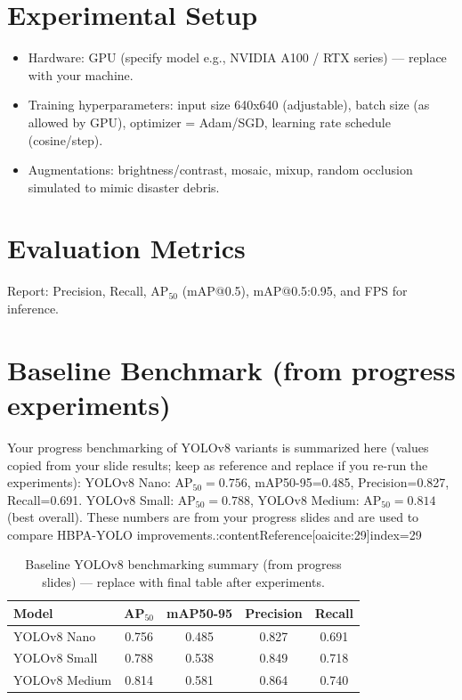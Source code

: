 \documentclass[12pt,a4paper]{report}
\begin{document}
\section{Experimental Setup}
\begin{itemize}
  \item Hardware: GPU (specify model e.g., NVIDIA A100 / RTX series) — replace with your machine.
  \item Training hyperparameters: input size 640x640 (adjustable), batch size (as allowed by GPU), optimizer = Adam/SGD, learning rate schedule (cosine/step).
  \item Augmentations: brightness/contrast, mosaic, mixup, random occlusion simulated to mimic disaster debris.
\end{itemize}

\section{Evaluation Metrics}
Report: Precision, Recall, AP$_{50}$ (mAP@0.5), mAP@0.5:0.95, and FPS for inference.

\section{Baseline Benchmark (from progress experiments)}
Your progress benchmarking of YOLOv8 variants is summarized here (values copied from your slide results; keep as reference and replace if you re-run the experiments): YOLOv8 Nano: AP$_{50}=0.756$, mAP50-95=0.485, Precision=0.827, Recall=0.691. YOLOv8 Small: AP$_{50}=0.788$, YOLOv8 Medium: AP$_{50}=0.814$ (best overall). These numbers are from your progress slides and are used to compare HBPA-YOLO improvements.:contentReference[oaicite:29]{index=29}

\begin{table}[H]
\centering
\caption{Baseline YOLOv8 benchmarking summary (from progress slides) — replace with final table after experiments.}
\begin{tabular}{lcccc}
\hline
Model & AP$_{50}$ & mAP50-95 & Precision & Recall \\
\hline
YOLOv8 Nano & 0.756 & 0.485 & 0.827 & 0.691 \\
YOLOv8 Small & 0.788 & 0.538 & 0.849 & 0.718 \\
YOLOv8 Medium & 0.814 & 0.581 & 0.864 & 0.740 \\
\hline
\end{tabular}
\end{table}
\end{document}
